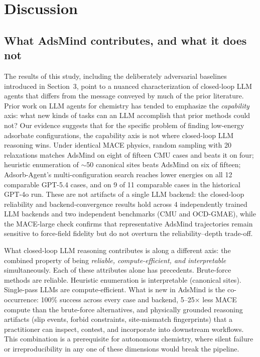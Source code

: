 \section{Discussion}

\subsection{What AdsMind contributes, and what it does not}

The results of this study, including the deliberately adversarial baselines introduced in Section~3, point to a nuanced characterization of closed-loop LLM agents that differs from the message conveyed by much of the prior literature.
Prior work on LLM agents for chemistry has tended to emphasize the \textit{capability} axis: what new kinds of tasks can an LLM accomplish that prior methods could not?
Our evidence suggests that for the specific problem of finding low-energy adsorbate configurations, the capability axis is not where closed-loop LLM reasoning wins.
Under identical MACE physics, random sampling with 20 relaxations matches AdsMind on eight of fifteen CMU cases and beats it on four; heuristic enumeration of $\sim$50 canonical sites beats AdsMind on six of fifteen; Adsorb-Agent's multi-configuration search reaches lower energies on all 12 comparable GPT-5.4 cases, and on 9 of 11 comparable cases in the historical GPT-4o run.
These are not artifacts of a single LLM backend: the closed-loop reliability and backend-convergence results hold across 4 independently trained LLM backends and two independent benchmarks (CMU and OCD-GMAE), while the MACE-large check confirms that representative AdsMind trajectories remain sensitive to force-field fidelity but do not overturn the reliability--depth trade-off.

What closed-loop LLM reasoning contributes is along a different axis: the combined property of being \textit{reliable, compute-efficient, and interpretable} simultaneously.
Each of these attributes alone has precedents. Brute-force methods are reliable.
Heuristic enumeration is interpretable (canonical sites). Single-pass LLMs are compute-efficient.
What is new in AdsMind is the co-occurrence: 100\% success across every case and backend, 5--25$\times$ less MACE compute than the brute-force alternatives, and physically grounded reasoning artifacts (slip events, forbid constraints, site-mismatch fingerprints) that a practitioner can inspect, contest, and incorporate into downstream workflows.
This combination is a prerequisite for autonomous chemistry, where silent failure or irreproducibility in any one of these dimensions would break the pipeline.

